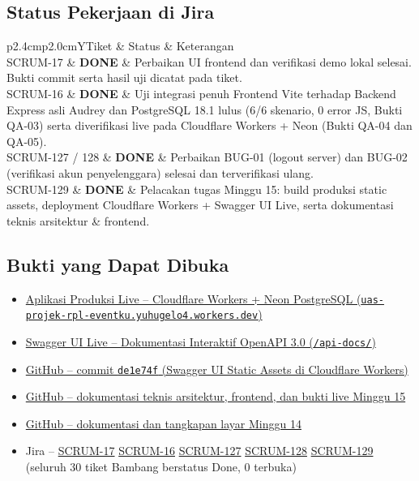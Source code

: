\documentclass[11pt,a4paper]{article}
\newcommand{\tbl}[2]{\par\smallskip\noindent\begin{tabularx}{\linewidth}{#1}\toprule #2\bottomrule\end{tabularx}\par\smallskip}
\begin{document}
\subsection*{Status Pekerjaan di Jira}
\tbl{p{2.4cm}p{2.0cm}Y}{Tiket & Status & Keterangan\\\midrule
SCRUM-17 & \textbf{DONE} & Perbaikan UI frontend dan verifikasi demo lokal selesai. Bukti commit serta hasil uji dicatat pada tiket.\\
SCRUM-16 & \textbf{DONE} & Uji integrasi penuh Frontend Vite terhadap Backend Express asli Audrey dan PostgreSQL 18.1 lulus (6/6 skenario, 0 error JS, Bukti QA-03) serta diverifikasi live pada Cloudflare Workers + Neon (Bukti QA-04 dan QA-05).\\
SCRUM-127 / 128 & \textbf{DONE} & Perbaikan BUG-01 (logout server) dan BUG-02 (verifikasi akun penyelenggara) selesai dan terverifikasi ulang.\\
SCRUM-129 & \textbf{DONE} & Pelacakan tugas Minggu 15: build produksi static assets, deployment Cloudflare Workers + Swagger UI Live, serta dokumentasi teknis arsitektur \& frontend.\\}

\subsection*{Bukti yang Dapat Dibuka}
\begin{itemize}
\item \href{https://uas-projek-rpl-eventku.yuhugelo4.workers.dev}{Aplikasi Produksi Live -- Cloudflare Workers + Neon PostgreSQL (\texttt{uas-projek-rpl-eventku.yuhugelo4.workers.dev})}
\item \href{https://uas-projek-rpl-eventku.yuhugelo4.workers.dev/api-docs/}{Swagger UI Live -- Dokumentasi Interaktif OpenAPI 3.0 (\texttt{/api-docs/})}
\item \href{https://github.com/alexabilxiz/UAS_PROJEK_RPL_EventKu/commit/de1e74f}{GitHub -- commit \texttt{de1e74f} (Swagger UI Static Assets di Cloudflare Workers)}
\item \href{https://github.com/alexabilxiz/UAS_PROJEK_RPL_EventKu/tree/main/docs/implementation/bambang/week15}{GitHub -- dokumentasi teknis arsitektur, frontend, dan bukti live Minggu 15}
\item \href{https://github.com/alexabilxiz/UAS_PROJEK_RPL_EventKu/tree/073e7a47f7ff0b133c53c3442cb7521f314482b1/docs/implementation/bambang/week14}{GitHub -- dokumentasi dan tangkapan layar Minggu 14}
\item Jira -- \href{https://eventku.atlassian.net/browse/SCRUM-17}{SCRUM-17} \textbar{} \href{https://eventku.atlassian.net/browse/SCRUM-16}{SCRUM-16} \textbar{} \href{https://eventku.atlassian.net/browse/SCRUM-127}{SCRUM-127} \textbar{} \href{https://eventku.atlassian.net/browse/SCRUM-128}{SCRUM-128} \textbar{} \href{https://eventku.atlassian.net/browse/SCRUM-129}{SCRUM-129} (seluruh 30 tiket Bambang berstatus Done, 0 terbuka)
\end{itemize}
\end{document}
